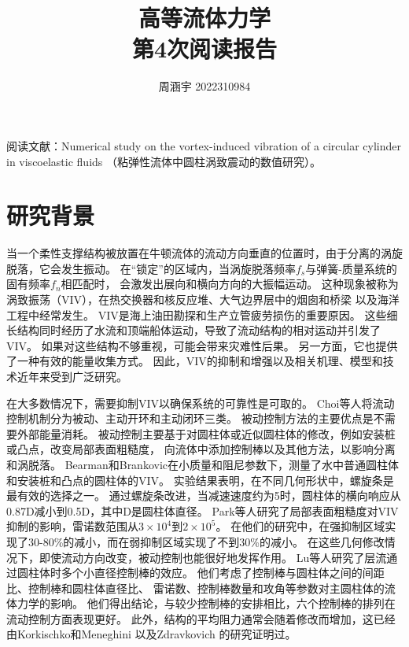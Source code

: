 \documentclass[UTF8,zihao=5]{ctexart} %
\title{{\bfseries\rmfamily\Huge{高等流体力学\hspace{1em}\\第4次阅读报告}}}
\author{周涵宇 2022310984}
\date{}
\begin{document}
\maketitle
\thispagestyle{fancy}



阅读文献：Numerical study on the vortex-induced vibration of
a circular cylinder in viscoelastic fluids\cite{xiong2019numerical}
（粘弹性流体中圆柱涡致震动的数值研究）。



\section{研究背景}

当一个柔性支撑结构被放置在牛顿流体的流动方向垂直的位置时，由于分离的涡旋脱落，它会发生振动。
在“锁定”的区域内，当涡旋脱落频率$f_s$与弹簧-质量系统的固有频率$f_n$相匹配时，
会激发出展向和横向方向的大振幅运动。
这种现象被称为涡致振荡（VIV），在热交换器和核反应堆、大气边界层中的烟囱和桥梁
以及海洋工程中经常发生。
VIV是海上油田勘探和生产立管疲劳损伤的重要原因。
这些细长结构同时经历了水流和顶端船体运动，导致了流动结构的相对运动并引发了VIV。
如果对这些结构不够重视，可能会带来灾难性后果。
另一方面，它也提供了一种有效的能量收集方式。
因此，VIV的抑制和增强以及相关机理、模型和技术近年来受到广泛研究。

在大多数情况下，需要抑制VIV以确保系统的可靠性是可取的。
Choi等人将流动控制机制分为被动、主动开环和主动闭环三类。
被动控制方法的主要优点是不需要外部能量消耗。
被动控制主要基于对圆柱体或近似圆柱体的修改，例如安装桩或凸点，改变局部表面粗糙度，
向流体中添加控制棒以及其他方法，以影响分离和涡脱落。
Bearman和Brankovic在小质量和阻尼参数下，测量了水中普通圆柱体和安装桩和凸点的圆柱体的VIV。
实验结果表明，在不同几何形状中，螺旋条是最有效的选择之一。
通过螺旋条改进，当减速速度约为5时，圆柱体的横向响应从0.87D减小到0.5D，其中D是圆柱体直径。
Park等人研究了局部表面粗糙度对VIV抑制的影响，雷诺数范围从$3×10^4$到$2×10^5$。
在他们的研究中，在强抑制区域实现了30-80\%的减小，而在弱抑制区域实现了不到30\%的减小。
在这些几何修改情况下，即使流动方向改变，被动控制也能很好地发挥作用。
Lu等人研究了层流通过圆柱体时多个小直径控制棒的效应。
他们考虑了控制棒与圆柱体之间的间距比、控制棒和圆柱体直径比、
雷诺数、控制棒数量和攻角等参数对主圆柱体的流体力学的影响。
他们得出结论，与较少控制棒的安排相比，六个控制棒的排列在流动控制方面表现更好。
此外，结构的平均阻力通常会随着修改而增加，这已经由Korkischko和Meneghini 以及Zdravkovich 的研究证明过。
\end{document}
